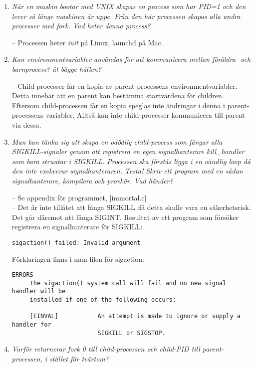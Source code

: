 \documentclass[paper=a4, fontsize=11pt]{scrartcl} %
\numberwithin{equation}{section} %
\numberwithin{figure}{section} %
\numberwithin{table}{section} %
\begin{document}
\begin{enumerate}[1)]
\item \emph{När en maskin bootar med UNIX skapas en process som har PID=1 och den lever så länge maskinen är uppe. Från den här processen skapas alla andra processer med fork. Vad heter denna process?}

-- Processen heter \emph{init} på Linux, launchd på Mac.

\item \emph{Kan environmentvariabler användas för att kommunicera mellan föräldra- och barnprocess? åt bägge hållen?}

-- Child-processer får en kopia av parent-processens environmentvariabler. Detta innebär att en parent kan bestämma startvärdena för children.
Eftersom child-processen får en kopia speglas inte ändringar i denna i parent-processens variabler. Alltså kan inte child-processer kommunicera till parent via dessa.

\item \emph{Man kan tänka sig att skapa en odödlig child-process som fångar alla SIGKILL-signaler genom att registrera en egen signalhanterare kill\_handler som bara struntar i SIGKILL. Processen ska förstås ligga i en oändlig loop då den inte exekverar signalhanteraren. Testa! Skriv ett program med en sådan signalhanterare, kompilera och provkör. Vad händer?}

-- Se appendix för programmet, |immortal.c| \\
-- Det är inte tillåtet att fånga SIGKILL då detta skulle vara en säkerhetsrisk. Det går däremot att fånga SIGINT.
Resultat av ett program som försöker registrera en signalhanterare för SIGKILL:

\begin{verbatim}
sigaction() failed: Invalid argument
\end{verbatim}

Förklaringen finns i man-filen för sigaction:
\begin{verbatim}
ERRORS
     The sigaction() system call will fail and no new signal handler will be
     installed if one of the following occurs:

     [EINVAL]           An attempt is made to ignore or supply a handler for
                        SIGKILL or SIGSTOP.
\end{verbatim}

\item \emph{Varför returnerar fork 0 till child-processen och child-PID till parent-processen, i stället för tvärtom?}


\end{enumerate}
\end{document}
